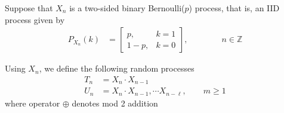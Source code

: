 \ifspanish

\else

Suppose that $X_n$ is a two-sided binary Bernoulli($p$) process, that is, an IID process given by
\begin{align*}
P_{X_n}(k) 
	&= \left[\begin{array}{ll}
             p,   &  k=1   \\
             1-p, &  k=0
          \end{array} \right]   %
,   \qquad\qquad n\in \mathbb{Z}
\end{align*}

Using $X_n$, we define the following random processes
\begin{align*}
T_n &= X_n \cdot X_{n-1}      \\
U_n &= X_n \cdot X_{n-1}, \cdots X_{n-\ell},    \qquad m \ge 1
\end{align*}
where operator $\oplus$ denotes mod 2 addition


